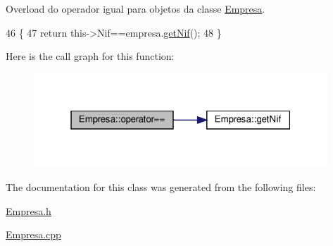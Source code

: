 Overload do operador igual para objetos da classe \hyperlink{classEmpresa}{Empresa}. 


\begin{DoxyCode}
46                                                   \{
47     \textcolor{keywordflow}{return} this->Nif==empresa.\hyperlink{classEmpresa_a6ab12452496ccaea5493bd2c67824f09}{getNif}();
48 \}
\end{DoxyCode}
Here is the call graph for this function\+:
\nopagebreak
\begin{figure}[H]
\begin{center}
\leavevmode
\includegraphics[width=313pt]{classEmpresa_ad915fb38bc6c73c02fe70c62db1c9f03_cgraph}
\end{center}
\end{figure}


The documentation for this class was generated from the following files\+:\begin{DoxyCompactItemize}
\item 
\hyperlink{Empresa_8h}{Empresa.\+h}\item 
\hyperlink{Empresa_8cpp}{Empresa.\+cpp}\end{DoxyCompactItemize}
